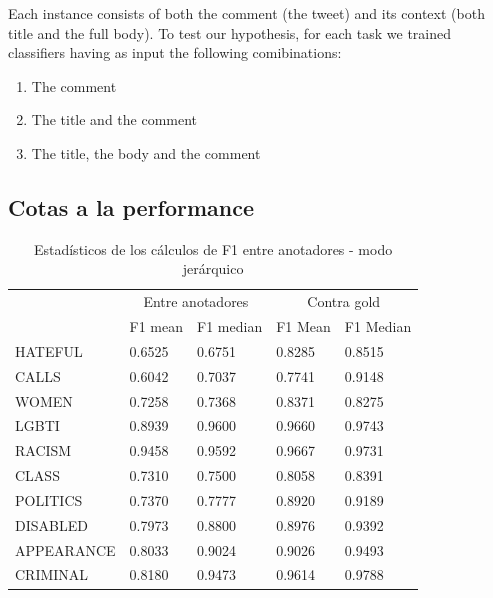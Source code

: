 Each instance consists of both the comment (the tweet) and its context (both title and the full body). To test our hypothesis, for each task we trained classifiers having as input the following comibinations:

\begin{enumerate}
    \item The comment
    \item The title and the comment
    \item The title, the body and the comment
\end{enumerate}


\subsection{Cotas a la performance}

\begin{table}
    \centering
    \begin{tabular}{lll|ll}
        \hline
                   & \multicolumn{2}{c}{Entre anotadores} & \multicolumn{2}{c}{Contra gold} \\
        {}         &  F1 mean&  F1 median  & F1 Mean  &  F1 Median \\
        \hline
        HATEFUL    &  0.6525 &   0.6751    & 0.8285   &   0.8515   \\
        CALLS      &  0.6042 &   0.7037    & 0.7741   &   0.9148   \\
        WOMEN      &  0.7258 &   0.7368    & 0.8371   &   0.8275   \\
        LGBTI      &  0.8939 &   0.9600    & 0.9660   &   0.9743   \\
        RACISM     &  0.9458 &   0.9592    & 0.9667   &   0.9731   \\
        CLASS      &  0.7310 &   0.7500    & 0.8058   &   0.8391   \\
        POLITICS   &  0.7370 &   0.7777    & 0.8920   &   0.9189   \\
        DISABLED   &  0.7973 &   0.8800    & 0.8976   &   0.9392   \\
        APPEARANCE &  0.8033 &   0.9024    & 0.9026   &   0.9493   \\
        CRIMINAL   &  0.8180 &   0.9473    & 0.9614   &   0.9788   \\
        \hline
    \end{tabular}
    \caption{Estadísticos de los cálculos de F1 entre anotadores - modo jerárquico}
    \label{tab:ia_f1_scores}
\end{table}

